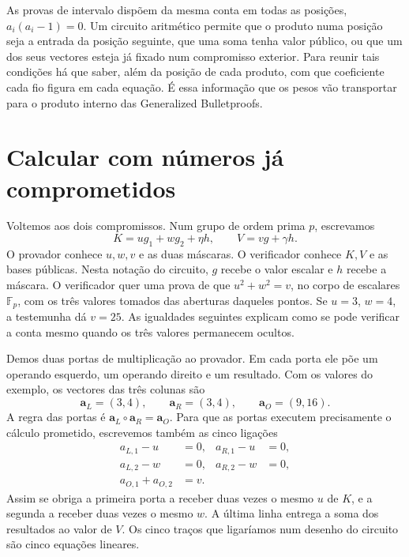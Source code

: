 As provas de intervalo dispõem da mesma conta em todas as posições,
\(a_i(a_i-1)=0\). Um circuito aritmético permite que o produto numa
posição seja a entrada da posição seguinte, que uma soma tenha valor
público, ou que um dos seus vectores esteja já fixado num compromisso
exterior. Para reunir tais condições há que saber, além da posição de
cada produto, com que coeficiente cada fio figura em cada equação.
É essa informação que os pesos vão transportar para o produto interno
das Generalized Bulletproofs.

\section{Calcular com números já comprometidos}
\label{sec:gbp-circuito}

Voltemos aos dois compromissos. Num grupo de ordem prima \(p\), escrevamos
\[
  K=u g_1+w g_2+\eta h,\qquad V=v g+\gamma h .
\]
O provador conhece \(u,w,v\) e as duas máscaras. O verificador conhece
\(K,V\) e as bases públicas. Nesta notação do circuito, \(g\) recebe
o valor escalar e \(h\) recebe a máscara. O verificador quer uma prova de que \(u^2+w^2=v\), no
corpo de escalares \(\mathbb F_p\), com os três valores tomados das
aberturas daqueles pontos. Se \(u=3\), \(w=4\), a testemunha dá
\(v=25\). As igualdades seguintes explicam como se pode verificar a conta
mesmo quando os três valores permanecem ocultos.

Demos duas portas de multiplicação ao provador. Em cada porta ele põe
um operando esquerdo, um operando direito e um resultado. Com os valores
do exemplo, os vectores das três colunas são
\[
 \boldsymbol a_L=(3,4),\qquad \boldsymbol a_R=(3,4),\qquad
 \boldsymbol a_O=(9,16).
\]
A regra das portas é \(\boldsymbol a_L\circ\boldsymbol a_R=\boldsymbol a_O\).
Para que as portas executem precisamente o cálculo prometido, escrevemos
também as cinco ligações
\begin{equation}
 \begin{aligned}
  a_{L,1}-u&=0, & a_{R,1}-u&=0,\\
  a_{L,2}-w&=0, & a_{R,2}-w&=0,\\
  a_{O,1}+a_{O,2}&=v .
 \end{aligned}
 \label{eq:gbp-duas-portas}
\end{equation}
Assim se obriga a primeira porta a receber duas vezes o mesmo \(u\) de
\(K\), e a segunda a receber duas vezes o mesmo \(w\). A última linha
entrega a soma dos resultados ao valor de \(V\). Os cinco traços que
ligaríamos num desenho do circuito são cinco equações lineares.

